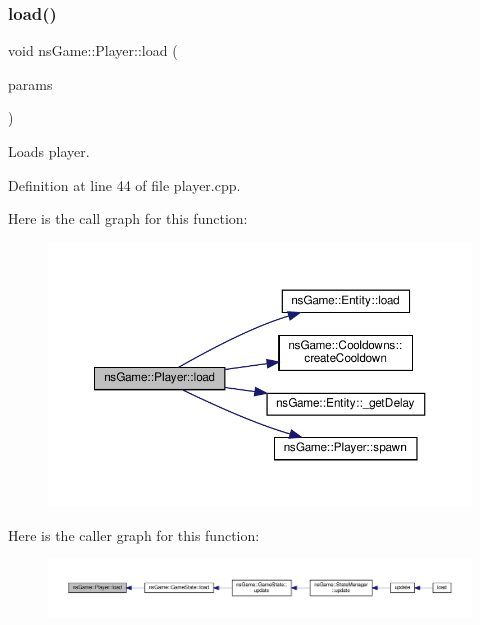 \mbox{\label{classns_game_1_1_player_a279b6cf908ceeb398d99d8cd1e02fa56}} 
\subsubsection{\texorpdfstring{load()}{load()}}
{\footnotesize\ttfamily void ns\+Game\+::\+Player\+::load (\begin{DoxyParamCaption}\item[{\hyperlink{struct_c_my_param}{C\+My\+Param}}]{params }\end{DoxyParamCaption})}



Loads player. 



Definition at line 44 of file player.\+cpp.

Here is the call graph for this function\+:\nopagebreak
\begin{figure}[H]
\begin{center}
\leavevmode
\includegraphics[width=350pt]{classns_game_1_1_player_a279b6cf908ceeb398d99d8cd1e02fa56_cgraph}
\end{center}
\end{figure}
Here is the caller graph for this function\+:\nopagebreak
\begin{figure}[H]
\begin{center}
\leavevmode
\includegraphics[width=350pt]{classns_game_1_1_player_a279b6cf908ceeb398d99d8cd1e02fa56_icgraph}
\end{center}
\end{figure}
\mbox{\label{classns_game_1_1_player_a6633913bc19fdca8616b29ee265f7b28}} 
